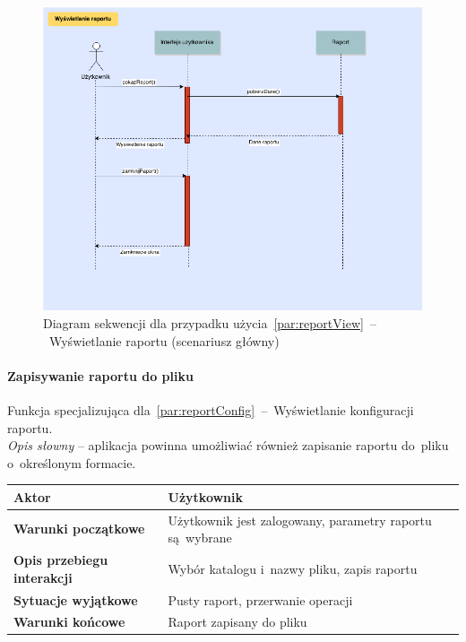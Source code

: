 \begin{figure}[H]
  \includegraphics[width=\textwidth]{images/raport_show.png}
  \caption{Diagram sekwencji dla przypadku użycia~\ref{par:reportView}~--~Wyświetlanie raportu (scenariusz główny)}
\end{figure}

\paragraph{Zapisywanie raportu do pliku\newline}
\label{par:reportExport}
\indent Funkcja specjalizująca dla~\ref{par:reportConfig}~--~Wyświetlanie konfiguracji raportu.\\

\textit{Opis słowny} -- aplikacja powinna umożliwiać również zapisanie raportu do~pliku o~określonym formacie.

\begin{longtable}{|p{5cm}|p{7cm}|}
  \hline \textbf{Aktor} & Użytkownik \\
  \hline \textbf{Warunki początkowe} & Użytkownik jest zalogowany, parametry raportu są~wybrane \\
  \hline \textbf{Opis przebiegu interakcji} & Wybór katalogu i~nazwy pliku, zapis raportu \\
  \hline \textbf{Sytuacje wyjątkowe} & Pusty raport, przerwanie operacji \\
  \hline \textbf{Warunki końcowe} & Raport zapisany do pliku \\
  \hline
\end{longtable}

